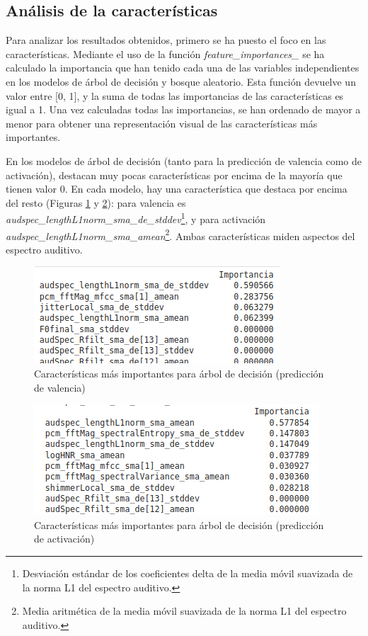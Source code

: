 \documentclass[12pt,a4paper]{article}
\begin{document}
\subsection{Análisis de la características}
Para analizar los resultados obtenidos, primero se ha puesto el foco en las características. Mediante el uso de la función \textit{feature\_importances\_} se ha calculado la importancia que han tenido cada una de las variables independientes en los modelos de árbol de decisión y bosque aleatorio. Esta función devuelve un valor entre [0, 1], y la suma de todas las importancias de las características es igual a 1. Una vez calculadas todas las importancias, se han ordenado de mayor a menor para obtener una representación visual de las características más importantes.


En los modelos de árbol de decisión (tanto para la predicción de valencia como de activación), destacan muy pocas características por encima de la mayoría que tienen valor 0. En cada modelo, hay una característica que destaca por encima del resto (Figuras \ref{fig:importtreeregval} y \ref{fig:importtreeregar}): para valencia es \textit{audspec\_lengthL1norm\_sma\_de\_stddev}\footnote{Desviación estándar de los coeficientes delta de la media móvil suavizada de la norma L1 del espectro auditivo.}, y para activación \textit{audspec\_lengthL1norm\_sma\_amean}\footnote{Media aritmética de la media móvil suavizada de la norma L1 del espectro auditivo.}. Ambas características miden aspectos del espectro auditivo.
\begin{figure}[H]
	\centering
	\includegraphics[width=0.6\linewidth]{figs/import_tree_reg_val}
	\caption{Características más importantes para árbol de decisión (predicción de valencia)}
	\label{fig:importtreeregval}
\end{figure}
\begin{figure}[H]
	\centering
	\includegraphics[width=0.7\linewidth]{figs/import_tree_reg_ar}
	\caption{Características más importantes para árbol de decisión (predicción de activación)}
	\label{fig:importtreeregar}
\end{figure}
\end{document}
